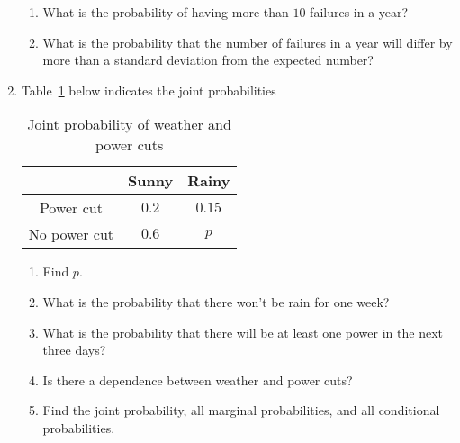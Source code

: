 \documentclass{article}
\begin{document}
\begin{enumerate}
\begin{enumerate}
			\item
			What is the probability of having more than $10$ failures in a year?
			\item
			What is the probability that the number of failures in a year will differ by more than a standard deviation from the expected number?
		\end{enumerate}
		\item
		Table~\ref{table_1} below indicates the joint probabilities
		\begin{table}[!htbp]
			\begin{center}
			\caption{Joint probability of weather and power cuts}
		\begin{tabular}{|c|c|c|}
			\hline
			& Sunny & Rainy\\
			\hline
			Power cut & $0.2$ & $0.15$ \\
			\hline
			No power cut & $0.6$ & $p$\\
			\hline
		\end{tabular}
		\label{table_1}
		\end{center}
		\end{table}
		\begin{enumerate}
			\item
			Find $p$.
			\item
			What is the probability that there won't be rain for one week?
			\item
			What is the probability that there will be at least one power in the next three days?
			\item
			Is there a dependence between weather and power cuts?
			\item
			Find the joint probability, all marginal probabilities, and all conditional probabilities.
		\end{enumerate}
	\end{enumerate}
	
\end{document}
